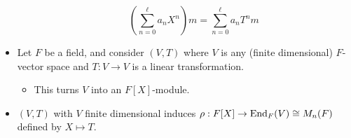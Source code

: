 \documentclass[../notes.tex]{subfiles}
\begin{document}
\begin{itemize}
\begin{itemize}
        \begin{equation*}
            \left( \sum_{n=0}^\ell a_nX^n \right)m = \sum_{n=0}^\ell a_nT^nm
        \end{equation*}
    \end{itemize}
    \item Let $F$ be a field, and consider $(V,T)$ where $V$ is any (finite dimensional) $F$-vector space and $T:V\to V$ is a linear transformation.
    \begin{itemize}
        \item This turns $V$ into an $F[X]$-module.
    \end{itemize}
    \item $(V,T)$ with $V$ finite dimensional induces $\rho:F[X]\to\operatorname{End}_F(V)\cong M_n(F)$ defined by $X\mapsto T$.
    \begin{figure}[H]
        \centering
\end{figure}
\end{itemize}
\end{document}
